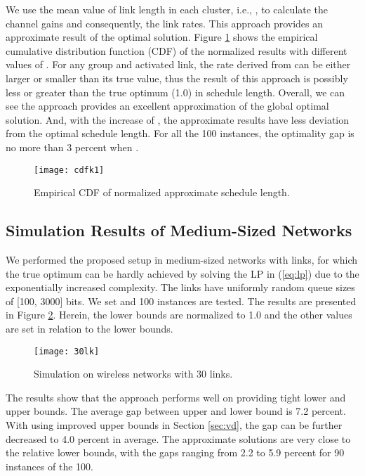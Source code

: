 \documentclass[10pt,onecolumn,journal,draftcls,oneside]{IEEEtran}
\begin{document}
We use the mean value of link length in each cluster, i.e., , to calculate the channel gains and consequently, the link rates. This approach provides an approximate result of the optimal solution. Figure \ref{fig:cdfk} shows the empirical cumulative distribution function (CDF) of the normalized results with different values of . For any group and activated link, the rate derived from  can be either larger or smaller than its true value, thus the result of this approach is possibly less or greater than the true optimum (1.0) in schedule length. Overall, we can see the approach provides an excellent approximation of the global optimal solution. And, with the increase of , the approximate results have less deviation from the optimal schedule length. For all the 100 instances, the optimality gap is no more than 3 percent when .

\begin{figure} [ht!]	
    \centering
{\texttt{[image: cdfk1]}}
\vspace{-5mm}
\caption{Empirical CDF of normalized approximate schedule length.}
\label{fig:cdfk}
\end{figure}

\subsection{Simulation Results of Medium-Sized Networks}

We performed the proposed setup in medium-sized networks with  links, for which the true optimum can be hardly achieved by solving the LP in (\ref{eq:lp}) due to the exponentially increased complexity. The links have uniformly random queue sizes of [100, 3000] bits. We set  and 100 instances are tested. The results are presented in Figure \ref{fig:30lk}. Herein, the lower bounds are normalized to 1.0 and the other values are set in relation to the lower bounds.

\begin{figure} [ht!]	
    \centering
{\texttt{[image: 30lk]}}
\vspace{-5mm}
\caption{Simulation on wireless networks with 30 links.}
\label{fig:30lk}
\end{figure}


The results show that the approach performs well on providing tight lower and upper bounds. The average gap between upper and lower bound is 7.2 percent. With using improved upper bounds in Section \ref{sec:vd}, the gap can be further decreased to 4.0 percent in average. The approximate solutions are very close to the relative lower bounds, with the gaps ranging from 2.2 to 5.9 percent for 90 instances of the 100.
\end{document}

